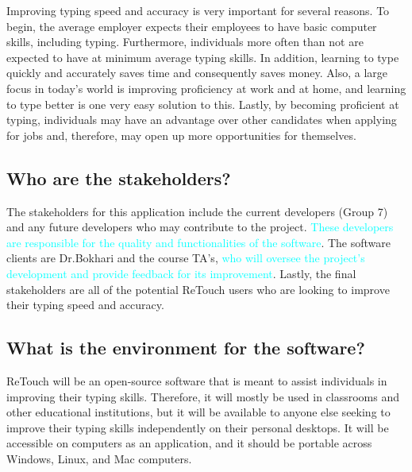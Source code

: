 \documentclass[12pt, oneside]{article}
\begin{document}
Improving typing speed and accuracy is very important for several reasons. To begin, the average employer expects their employees to have basic computer skills, including typing. Furthermore, individuals more often than not are expected to have at minimum average typing skills. In addition, learning to type quickly and accurately saves time and consequently saves money. Also, a large focus in today's world is improving proficiency at work and at home, and learning to type better is one very easy solution to this. Lastly, by becoming proficient at typing, individuals may have an advantage over other candidates when applying for jobs and, therefore, may open up more opportunities for themselves.
\\

\color{cyan}
\subsection{Who are the stakeholders?}
\color{black}

The stakeholders for this application include the current developers (Group 7) and any future developers who may contribute to the project. \textcolor{cyan}{These developers are responsible for the quality and functionalities of the software}. The software clients are Dr.Bokhari and the course TA's, \textcolor{cyan}{who will oversee the project's development and provide feedback for its improvement}. Lastly, the final stakeholders are all of the potential ReTouch users who are looking to improve their typing speed and accuracy. 
\\
\color{cyan} \subsection{What is the environment for the software?}
\color{black}

ReTouch will be an open-source software that is meant to assist individuals in improving their typing skills. Therefore, it will mostly be used in classrooms and other educational institutions, but it will be available to anyone else seeking to improve their typing skills independently \color{cyan}on their personal desktops. It will be accessible on computers as an application, and it should be portable across Windows, Linux, and Mac computers.
\end{document}
